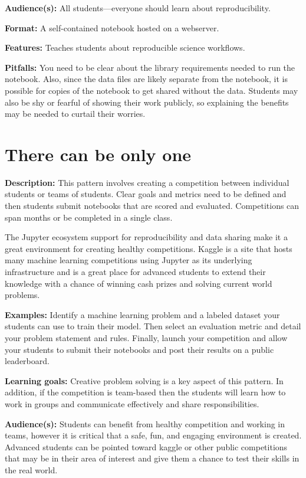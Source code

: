 \documentclass[]{book}
\begin{document}
\textbf{Audience(s):} All students---everyone should learn about
reproducibility.

\textbf{Format:} A self-contained notebook hosted on a webserver.

\textbf{Features:} Teaches students about reproducible science
workflows.

\textbf{Pitfalls:} You need to be clear about the library requirements
needed to run the notebook. Also, since the data files are likely
separate from the notebook, it is possible for copies of the notebook to
get shared without the data. Students may also be shy or fearful of
showing their work publicly, so explaining the benefits may be needed to
curtail their worries.

\section{There can be only one}\label{there-can-be-only-one}

\textbf{Description:} This pattern involves creating a competition
between individual students or teams of students. Clear goals and
metrics need to be defined and then students submit notebooks that are
scored and evaluated. Competitions can span months or be completed in a
single class.

The Jupyter ecosystem support for reproducibility and data sharing make
it a great environment for creating healthy competitions. Kaggle is a
site that hosts many machine learning competitions using Jupyter as its
underlying infrastructure and is a great place for advanced students to
extend their knowledge with a chance of winning cash prizes and solving
current world problems.

\textbf{Examples:} Identify a machine learning problem and a labeled
dataset your students can use to train their model. Then select an
evaluation metric and detail your problem statement and rules. Finally,
launch your competition and allow your students to submit their
notebooks and post their results on a public leaderboard.

\textbf{Learning goals:} Creative problem solving is a key aspect of
this pattern. In addition, if the competition is team-based then the
students will learn how to work in groups and communicate effectively
and share responsibilities.

\textbf{Audience(s):} Students can benefit from healthy competition and
working in teams, however it is critical that a safe, fun, and engaging
environment is created. Advanced students can be pointed toward kaggle
or other public competitions that may be in their area of interest and
give them a chance to test their skills in the real world.
\end{document}
